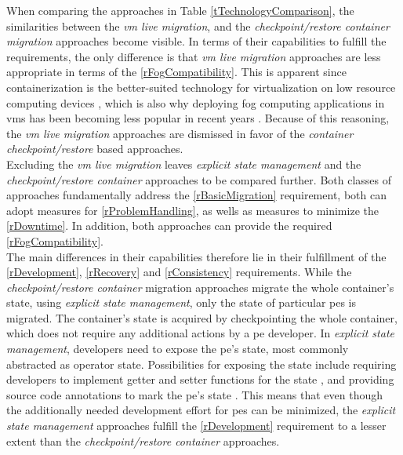 When comparing the approaches in Table \ref{tTechnologyComparison}, the similarities between the \textit{\gls{vm} live migration}, and the \textit{checkpoint/restore container migration} approaches become visible. In terms of their capabilities to fulfill the requirements, the only difference is that \textit{\gls{vm} live migration} approaches are less appropriate in terms of the \ref{rFogCompatibility}. This is apparent since containerization is the better-suited technology for virtualization on low resource computing devices \cite{Jalali.2016}, which is also why deploying fog computing applications in \gls{vm}s has been becoming less popular in recent years \cite{Puliafito.2018}. Because of this reasoning, the \textit{\gls{vm} live migration} approaches are dismissed in favor of the \textit{container checkpoint/restore} based approaches.\\
Excluding the \textit{\gls{vm} live migration} leaves \textit{explicit state management} and the \textit{checkpoint/restore container} approaches to be compared further. Both classes of approaches fundamentally address the \ref{rBasicMigration} requirement, both can adopt measures for \ref{rProblemHandling}, as wells as measures to minimize the \ref{rDowntime}. In addition, both approaches can provide the required \ref{rFogCompatibility}.\\ 
The main differences in their capabilities therefore lie in their fulfillment of the \ref{rDevelopment}, \ref{rRecovery} and \ref{rConsistency} requirements. While the \textit{checkpoint/restore container} migration approaches migrate the whole container's state, using \textit{explicit state management}, only the state of particular \gls{pe}s is migrated. The container's state is acquired by checkpointing the whole container, which does not require any additional actions by a \gls{pe} developer. In \textit{explicit state management}, developers need to expose the \gls{pe}'s state, most commonly abstracted as operator state. Possibilities for exposing the state include requiring developers to implement getter and setter functions for the state \cite{CastroFernandez.2013, Saurez.2016}, and providing source code annotations to mark the \gls{pe}'s state \cite{Gibson.2014}. This means that even though the additionally needed development effort for \gls{pe}s can be minimized, the \textit{explicit state management} approaches fulfill the \ref{rDevelopment} requirement to a lesser extent than the \textit{checkpoint/restore container} approaches.\\
